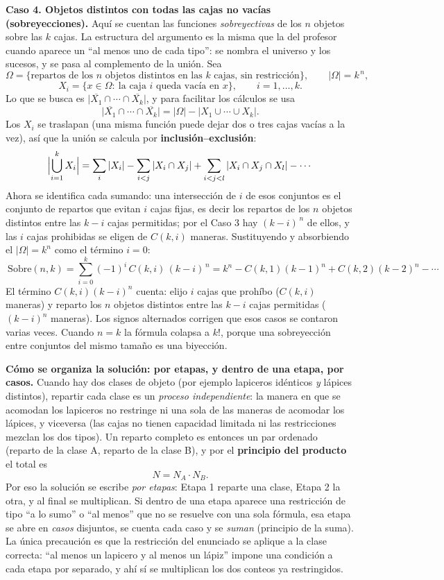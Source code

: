 \documentclass[11pt]{article}
\begin{document}
\begin{teo}
\medskip
\textbf{Caso 4. Objetos distintos con todas las cajas no vacías (sobreyecciones).}
Aquí se cuentan las funciones \emph{sobreyectivas} de los $n$ objetos sobre las $k$ cajas. La estructura del argumento es la misma que la del profesor cuando aparece un ``al menos uno de cada tipo'': se nombra el universo y los sucesos, y se pasa al complemento de la unión. Sea
\[
\Omega=\{\text{repartos de los }n\text{ objetos distintos en las }k\text{ cajas, sin restricción}\},\qquad |\Omega|=k^{\,n},
\]
\[
X_i=\{x\in\Omega:\ \text{la caja }i\text{ queda vacía en }x\},\qquad i=1,\dots,k .
\]
Lo que se busca es $\bigl|\overline{X_1}\cap\cdots\cap\overline{X_k}\bigr|$, y para facilitar los cálculos se usa
\[
\bigl|\overline{X_1}\cap\cdots\cap\overline{X_k}\bigr|=|\Omega|-\bigl|X_1\cup\cdots\cup X_k\bigr| .
\]
Los $X_i$ se traslapan (una misma función puede dejar dos o tres cajas vacías a la vez), así que la unión se calcula por \textbf{inclusión--exclusión}:
\[
\Bigl|\bigcup_{i=1}^{k}X_i\Bigr|=\sum_{i}|X_i|-\sum_{i<j}|X_i\cap X_j|+\sum_{i<j<l}|X_i\cap X_j\cap X_l|-\cdots
\]
Ahora se identifica cada sumando: una intersección de $i$ de esos conjuntos es el conjunto de repartos que evitan $i$ cajas fijas, es decir los repartos de los $n$ objetos distintos entre las $k-i$ cajas permitidas; por el Caso 3 hay $(k-i)^{\,n}$ de ellos, y las $i$ cajas prohibidas se eligen de $C(k,i)$ maneras. Sustituyendo y absorbiendo el $|\Omega|=k^n$ como el término $i=0$:
\[
\boxed{\ \text{Sobre}(n,k)=\sum_{i=0}^{k}(-1)^i\,C(k,i)\,(k-i)^{\,n}
=k^n-C(k,1)(k-1)^n+C(k,2)(k-2)^n-\cdots\ }
\]
El término $C(k,i)(k-i)^n$ cuenta: elijo $i$ cajas que prohíbo ($C(k,i)$ maneras) y reparto los $n$ objetos distintos entre las $k-i$ cajas permitidas ($(k-i)^n$ maneras). Los signos alternados corrigen que esos casos se contaron varias veces. Cuando $n=k$ la fórmula colapsa a $k!$, porque una sobreyección entre conjuntos del mismo tamaño es una biyección.

\medskip
\textbf{Cómo se organiza la solución: por etapas, y dentro de una etapa, por casos.}
Cuando hay dos clases de objeto (por ejemplo lapiceros idénticos \emph{y} lápices distintos), repartir cada clase es un \emph{proceso independiente}: la manera en que se acomodan los lapiceros no restringe ni una sola de las maneras de acomodar los lápices, y viceversa (las cajas no tienen capacidad limitada ni las restricciones mezclan los dos tipos). Un reparto completo es entonces un par ordenado (reparto de la clase A, reparto de la clase B), y por el \textbf{principio del producto} el total es
\[
N=N_A\cdot N_B .
\]
Por eso la solución se escribe \emph{por etapas}: Etapa 1 reparte una clase, Etapa 2 la otra, y al final se multiplican. Si dentro de una etapa aparece una restricción de tipo ``a lo sumo'' o ``al menos'' que no se resuelve con una sola fórmula, esa etapa se abre en \emph{casos} disjuntos, se cuenta cada caso y se \emph{suman} (principio de la suma). La única precaución es que la restricción del enunciado se aplique a la clase correcta: ``al menos un lapicero y al menos un lápiz'' impone una condición a cada etapa por separado, y ahí sí se multiplican los dos conteos ya restringidos.
\end{teo}
\end{document}
